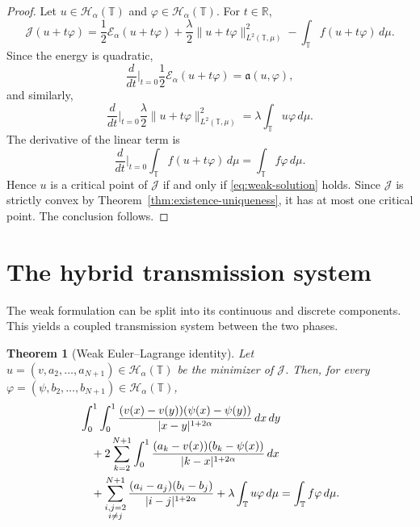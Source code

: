 \documentclass[11pt]{article}
\numberwithin{equation}{section}
\newtheorem{theorem}{Theorem}[section]
\theoremstyle{definition}
\newcommand{\R}{\mathbb{R}}
\newcommand{\T}{\mathbb{T}}
\newcommand{\EE}{\mathcal{E}}
\newcommand{\JJ}{\mathcal{J}}
\newcommand{\HH}{\mathcal{H}}
\newcommand{\ddmu}{\,d\mu}
\newcommand{\abs}[1]{\lvert#1\rvert}
\newcommand{\norm}[1]{\lVert#1\rVert}
\begin{document}
\begin{proof}
Let $u\in\HH_\alpha(\T)$ and $\varphi\in\HH_\alpha(\T)$. For $t\in\R$,
\[
\JJ(u+t\varphi)
=\frac12\EE_\alpha(u+t\varphi)+\frac{\lambda}{2}\norm{u+t\varphi}_{L^2(\T,\mu)}^2-\int_{\T}f(u+t\varphi)\ddmu.
\]
Since the energy is quadratic,
\[
\frac{d}{dt}\Big|_{t=0}\frac12\EE_\alpha(u+t\varphi)=\mathfrak a(u,\varphi),
\]
and similarly,
\[
\frac{d}{dt}\Big|_{t=0}\frac{\lambda}{2}\norm{u+t\varphi}_{L^2(\T,\mu)}^2
=\lambda\int_{\T}u\varphi\ddmu.
\]
The derivative of the linear term is
\[
\frac{d}{dt}\Big|_{t=0}\int_{\T}f(u+t\varphi)\ddmu
=\int_{\T}f\varphi\ddmu.
\]
Hence $u$ is a critical point of $\JJ$ if and only if \eqref{eq:weak-solution} holds. Since $\JJ$ is strictly convex by Theorem~\ref{thm:existence-uniqueness}, it has at most one critical point. The conclusion follows.
\end{proof}

\section{The hybrid transmission system}\label{sec:transmission}

The weak formulation can be split into its continuous and discrete components. This yields a coupled transmission system between the two phases.

\begin{theorem}[Weak Euler--Lagrange identity]\label{thm:weak-EL}
Let $u=(v,a_2,\dots,a_{N+1})\in\HH_\alpha(\T)$ be the minimizer of $\JJ$. Then, for every $\varphi=(\psi,b_2,\dots,b_{N+1})\in\HH_\alpha(\T)$,
\begin{align}\label{eq:split-weak-form}
&\int_0^1\int_0^1
\frac{(v(x)-v(y))(\psi(x)-\psi(y))}{\abs{x-y}^{1+2\alpha}}\,dx\,dy \notag\\
&\quad +2\sum_{k=2}^{N+1}\int_0^1
\frac{(a_k-v(x))(b_k-\psi(x))}{\abs{k-x}^{1+2\alpha}}\,dx \\
&\quad +\sum_{\substack{i,j=2\\ i\neq j}}^{N+1}
\frac{(a_i-a_j)(b_i-b_j)}{\abs{i-j}^{1+2\alpha}}
+\lambda\int_{\T}u\varphi\ddmu
=\int_{\T}f\varphi\ddmu.\notag
\end{align}
\end{theorem}
\end{document}
